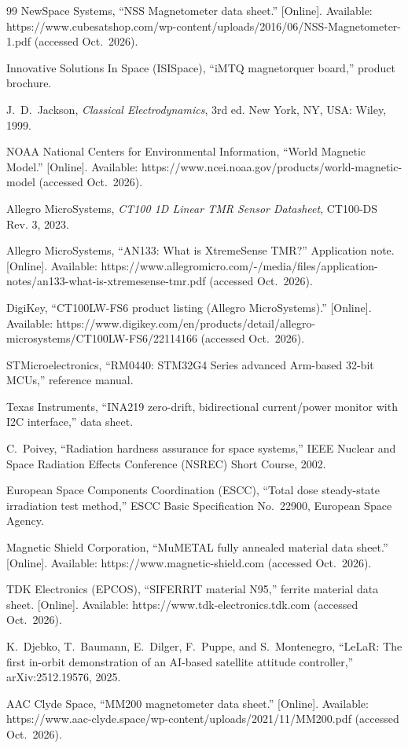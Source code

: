 \documentclass[12pt,a4paper]{article}
\begin{document}
\begin{thebibliography}{99}
NewSpace Systems, ``NSS Magnetometer data sheet.'' [Online]. Available: https://www.cubesatshop.com/wp-content/uploads/2016/06/NSS-Magnetometer-1.pdf (accessed Oct.\ 2026).

Innovative Solutions In Space (ISISpace), ``iMTQ magnetorquer board,'' product brochure.

J.\ D.\ Jackson, \emph{Classical Electrodynamics}, 3rd ed. New York, NY, USA: Wiley, 1999.

NOAA National Centers for Environmental Information, ``World Magnetic Model.'' [Online]. Available: https://www.ncei.noaa.gov/products/world-magnetic-model (accessed Oct.\ 2026).

Allegro MicroSystems, \emph{CT100 1D Linear TMR Sensor Datasheet}, CT100-DS Rev. 3, 2023.

Allegro MicroSystems, ``AN133: What is XtremeSense TMR?'' Application note. [Online]. Available: https://www.allegromicro.com/-/media/files/application-notes/an133-what-is-xtremesense-tmr.pdf (accessed Oct.\ 2026).

DigiKey, ``CT100LW-FS6 product listing (Allegro MicroSystems).'' [Online]. Available: https://www.digikey.com/en/products/detail/allegro-microsystems/CT100LW-FS6/22114166 (accessed Oct.\ 2026).

STMicroelectronics, ``RM0440: STM32G4 Series advanced Arm-based 32-bit MCUs,'' reference manual.

Texas Instruments, ``INA219 zero-drift, bidirectional current/power monitor with I2C interface,'' data sheet.

C.\ Poivey, ``Radiation hardness assurance for space systems,'' IEEE Nuclear and Space Radiation Effects Conference (NSREC) Short Course, 2002.

European Space Components Coordination (ESCC), ``Total dose steady-state irradiation test method,'' ESCC Basic Specification No.~22900, European Space Agency.

Magnetic Shield Corporation, ``MuMETAL fully annealed material data sheet.'' [Online]. Available: https://www.magnetic-shield.com (accessed Oct.\ 2026).

TDK Electronics (EPCOS), ``SIFERRIT material N95,'' ferrite material data sheet. [Online]. Available: https://www.tdk-electronics.tdk.com (accessed Oct.\ 2026).

K.\ Djebko, T.\ Baumann, E.\ Dilger, F.\ Puppe, and S.\ Montenegro, ``LeLaR: The first in-orbit demonstration of an AI-based satellite attitude controller,'' arXiv:2512.19576, 2025.

AAC Clyde Space, ``MM200 magnetometer data sheet.'' [Online]. Available: https://www.aac-clyde.space/wp-content/uploads/2021/11/MM200.pdf (accessed Oct.\ 2026).

\end{thebibliography}
\end{document}
